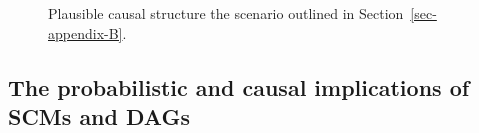 \documentclass[
  authoryear,
  review,
  1p]{elsarticle}
\begin{document}
\begin{figure}

\begin{minipage}{0.50\linewidth}

\centering{

\[
\begin{aligned}
  X & := f_{X}(e_{X}) \\
  T & := f_{Z}(X,e_{T}) \\
  Y & := f_{Y}(T,X,e_{Y}) \\
  e_{T} & \perp\!\!\!\perp e_{X} \\
  e_{T} & \perp\!\!\!\perp e_{Y} \\
  e_{X} & \perp\!\!\!\perp e_{Y}
\end{aligned}
\]

}


\end{minipage}%
%
\begin{minipage}{0.50\linewidth}



\end{minipage}%

\caption{\label{fig-example}Plausible causal structure the scenario
outlined in Section~\ref{sec-appendix-B}.}

\end{figure}%

\subsection{The probabilistic and causal implications of SCMs and
DAGs}\label{sec-appendix-D}
\end{document}
